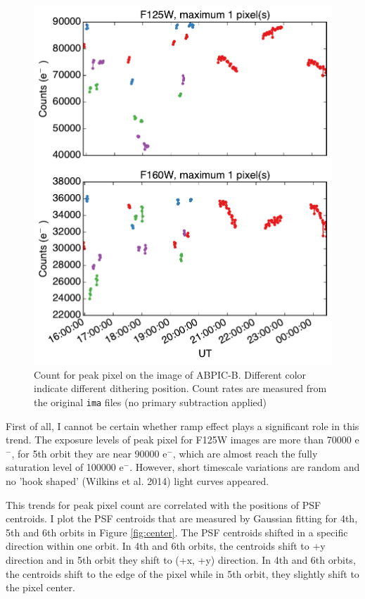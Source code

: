 \documentclass[paper=letter, fontsize=11pt]{scrartcl} %
\numberwithin{equation}{section} %
\numberwithin{figure}{section} %
\numberwithin{table}{section} %
\begin{document}
    \begin{figure}[th]
    \centering
    \includegraphics[width=\textwidth]{ramp1Pix}
    \caption{Count for peak pixel on the image of ABPIC-B. Different
      color indicate different dithering position. Count rates are measured
      from the original \texttt{ima} files (no primary subtraction applied)}
    \label{fig:peak}
  \end{figure}

  First of all, I cannot be certain whether ramp effect plays a
  significant role in this trend. The exposure levels of peak pixel for
  F125W images are more than 70000 e$^{-}$, for 5th orbit they are
  near 90000 e$^{-}$, which are almost reach the fully saturation
  level of 100000 e$^{-}$. However, short timescale variations are
  random and no 'hook shaped' (Wilkins et al. 2014) light curves
  appeared.

  This trends for peak pixel count are correlated with the positions of
  PSF centroids. I plot the PSF centroids that are measured by Gaussian
  fitting for 4th, 5th and 6th orbits in Figure \ref{fig:center}. The
  PSF centroids shifted in a specific direction within one orbit. In
  4th and 6th orbits, the centroids shift to +y direction and in 5th
  orbit they shift to (+x, +y) direction. In 4th and 6th orbits, the
  centroids shift to the edge of the pixel while in 5th orbit, they
  slightly shift to the pixel center.
\end{document}
